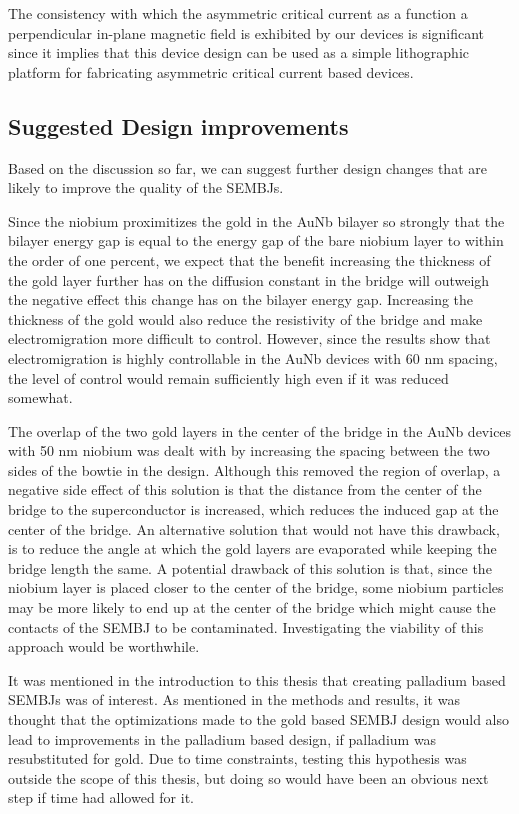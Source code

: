 The consistency with which the asymmetric critical current as a function a perpendicular in-plane magnetic field is exhibited by our devices is significant since it implies that this device design can be used as a simple lithographic platform for fabricating asymmetric critical current based devices.

\subsection{Suggested Design improvements}

Based on the discussion so far, we can suggest further design changes that are likely to improve the quality of the SEMBJs. 

Since the niobium proximitizes the gold in the AuNb bilayer so strongly that the bilayer energy gap is equal to the energy gap of the bare niobium layer to within the order of one percent, we expect that the benefit increasing the thickness of the gold layer further has on the diffusion constant in the bridge will outweigh the negative effect this change has on the bilayer energy gap. Increasing the thickness of the gold would also reduce the resistivity of the bridge and make electromigration more difficult to control. However, since the results show that electromigration is highly controllable in the AuNb devices with 60 nm spacing, the level of control would remain sufficiently high even if it was reduced somewhat.

The overlap of the two gold layers in the center of the bridge in the AuNb devices with 50 nm niobium was dealt with by increasing the spacing between the two sides of the bowtie in the design. Although this removed the region of overlap, a negative side effect of this solution is that the distance from the center of the bridge to the superconductor is increased, which reduces the induced gap at the center of the bridge. An alternative solution that would not have this drawback, is to reduce the angle at which the gold layers are evaporated while keeping the bridge length the same. A potential drawback of this solution is that, since the niobium layer is placed closer to the center of the bridge, some niobium particles may be more likely to end up at the center of the bridge which might cause the contacts of the SEMBJ to be contaminated. Investigating the viability of this approach would be worthwhile.

It was mentioned in the introduction to this thesis that creating palladium based SEMBJs was of interest. As mentioned in the methods and results, it was thought that the optimizations made to the gold based SEMBJ design would also lead to improvements in the palladium based design, if palladium was resubstituted for gold. Due to time constraints, testing this hypothesis was outside the scope of this thesis, but doing so would have been an obvious next step if time had allowed for it.









